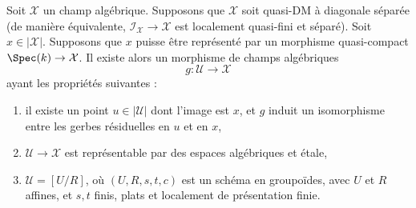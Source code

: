 \begin{lemma}
\label{lemma-etale-local-quasi-DM-at-x-inertia}
Soit $\mathcal{X}$ un champ alg\'ebrique. Supposons que $\mathcal{X}$ soit
quasi-DM \`a diagonale s\'epar\'ee (de mani\`ere \'equivalente,
$\mathcal{I}_\mathcal{X} \to \mathcal{X}$ est localement quasi-fini et
s\'epar\'e). Soit $x \in |\mathcal{X}|$. Supposons que $x$ puisse \^etre repr\'esent\'e
par un morphisme quasi-compact $\Spec(k) \to \mathcal{X}$.
Il existe alors un morphisme de champs alg\'ebriques
$$
g : \mathcal{U} \longrightarrow \mathcal{X}
$$
ayant les propri\'et\'es suivantes :
\begin{enumerate}
\item il existe un point $u \in |\mathcal{U}|$ dont l'image est $x$, et
$g$ induit un isomorphisme entre les gerbes r\'esiduelles en $u$ et en $x$,
\item $\mathcal{U} \to \mathcal{X}$ est repr\'esentable par des espaces alg\'ebriques et
\'etale,
\item $\mathcal{U} = [U/R]$, o\`u $(U, R, s, t, c)$ est un sch\'ema
en groupo\"ides, avec $U$ et $R$ affines, et $s, t$ finis, plats et
localement de pr\'esentation finie.
\end{enumerate}
\end{lemma}

